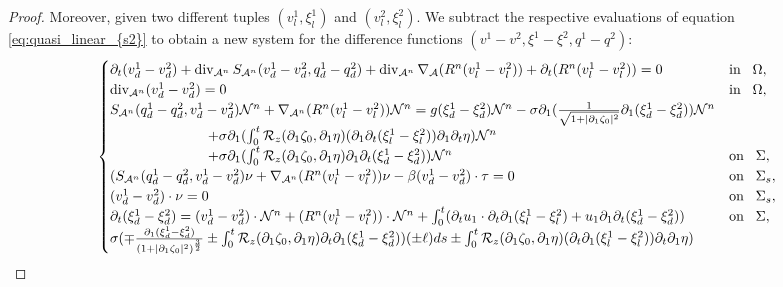 \documentclass[letterpaper,reqno,10pt,twoside]{amsart}
\theoremstyle{definition}
\theoremstyle{remark}
\def\p{\partial}
\def\dive{\mathop{\rm div}\nolimits}
\begin{document}
\begin{proof}
{			Moreover, given two different tuples $(v_{l}^{1},\xi_{l}^{1})$ and $(v_{l}^{2},\xi_{l}^{2})$. We subtract the respective evaluations of equation \eqref{eq:quasi_linear_{s2}} to obtain a new system for the difference functions $(v^{1}-v^{2},\xi^{1}-\xi^{2},q^{1}-q^{2})$:
			\[
			\begin{cases}
				\partial_{t}(v_{d}^{1}-v_{d}^{2})+\operatorname{div}_{\mathcal{A}^{n}}S_{\mathcal{A}^{n}}(v_{d}^{1}-v_{d}^{2},q_{d}^{1}-q_{d}^{2})+\dive_{\mathcal{A}^{n}}\nabla_{\mathcal{A}}(R^{n}(v_{l}^{1}-v_{l}^{2}))+\p_{t}(R^{n}(v_{l}^{1}-v_{l}^{2}))=0~~~&\operatorname{in}~~\Omega,\\
				\operatorname{div}_{\mathcal{A}^{n}}(v_{d}^{1}-v_{d}^{2})=0~~~&\operatorname{in}~~\Omega,\\
				S_{\mathcal{A}^{n}}(q_{d}^{1}-q_{d}^{2},v_{d}^{1}-v_{d}^{2})\mathcal{N}^{n}+\nabla_{\mathcal{A}^{n}}(R^{n}(v_{l}^{1}-v_{l}^{2}))\mathcal{N}^{n}=g(\xi_{d}^{1}-\xi_{d}^{2})\mathcal{N}^{n}-\sigma\partial_{1}(\frac{1}{\sqrt{1+\vert \partial_{1}\zeta_{0}\vert^{2}}}\partial_{1}(\xi_{d}^{1}-\xi_{d}^{2}))\mathcal{N}^{n}\\
				\quad\quad\quad\quad\quad\quad\quad+\sigma\partial_{1}(\int_{0}^{t}\mathcal{R}_{z}(\partial_{1}\zeta_{0},\partial_{1}\eta)(\partial_{1}\p_{t}(\xi_{l}^{1}-\xi_{l}^{2}))\p_{1}\p_{t}\eta)\mathcal{N}^{n}\\
				\quad\quad\quad\quad\quad\quad\quad+\sigma\partial_{1}(\int_{0}^{t}\mathcal{R}_{z}(\partial_{1}\zeta_{0},\partial_{1}\eta)\partial_{1}\partial_{t}(\xi_{d}^{1}-\xi_{d}^{2}))\mathcal{N}^{n}~~~&\operatorname{on}~~\Sigma,\\
				(S_{\mathcal{A}^{n}}(q_{d}^{1}-q_{d}^{2},v_{d}^{1}-v_{d}^{2})\nu+\nabla_{\mathcal{A}^{n}}(R^{n}(v_{l}^{1}-v_{l}^{2}))\nu-\beta (v_{d}^{1}-v_{d}^{2})\cdot \tau=0~~~&\operatorname{on}~~\Sigma_{s},\\
				(v_{d}^{1}-v_{d}^{2})\cdot \nu=0~~~&\operatorname{on}~~\Sigma_{s},\\
				\partial_{t}(\xi_{d}^{1}-\xi_{d}^{2})=(v_{d}^{1}-v_{d}^{2})\cdot \mathcal{N}^{n}+(R^{n}(v_{l}^{1}-v_{l}^{2}))\cdot \mathcal{N}^{n}+\int_{0}^{t}(\partial_{t}u_{1}\cdot\partial_{t}\p_{1}(\xi_{l}^{1}-\xi_{l}^{2})+u_{1}\partial_{1}\partial_{t}(\xi_{d}^{1}-\xi_{d}^{2}))~~~&\operatorname{on}~~\Sigma,\\
				\sigma(\mp \frac{\partial_{1}(\xi_{d}^{1}-\xi_{d}^{2})}{(1+\vert \partial_{1}\zeta_{0}\vert^{2})^{\frac{3}{2}}}\pm \int_{0}^{t}\mathcal{R}_{z}(\partial_{1}\zeta_{0},\partial_{1}\eta)\partial_{t}\partial_{1}(\xi_{d}^{1}-\xi_{d}^{2}))(\pm \ell)ds\pm\int_{0}^{t}\mathcal{R}_{z}(\p_{1}\zeta_{0},\p_{1}\eta)(\p_{t}\p_{1}(\xi_{l}^{1}-\xi_{l}^{2}))\p_{t}\p_{1}\eta)\\

\end{cases}\]}
\end{proof}
\end{document}

